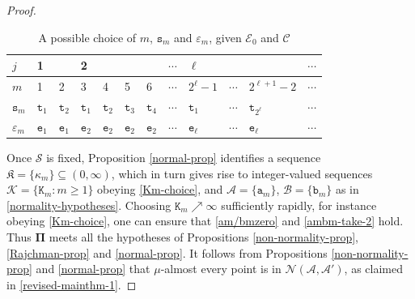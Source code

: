 \documentclass[12pt, twoside]{article}
\theoremstyle{definition}
\numberwithin{equation}{section}
\begin{document}
\begin{proof}
\begin{table}[htb]
		\begin{center}
			\begin{tabular}{|l|ll|llll|l|lll|l}
				\hline
				$j$ & 1 &   &  2 &   &   &   & $\cdots$ & $\ell$ &  & & $\cdots$\\
				\hline
				$m$ & 1 & 2 & 3 & 4 & 5 & 6 & $\cdots$ & $2^{\ell}-1$ & $\cdots$ & $2^{\ell +1}-2$ & $\cdots$\\
				\hline
				$\mathtt s_m$ & $\mathtt t_1$ & $\mathtt t_2$ & $\mathtt t_1$ & $\mathtt t_2$ & $\mathtt t_3$ & $\mathtt t_4$ & $\cdots$ & $\mathtt t_1$ & $\cdots$ & $\mathtt t_{2^{\ell}}$ & $\cdots$\\
				\hline
				$\varepsilon_m$ & $\mathtt e_1$ & $\mathtt e_1$ & $\mathtt e_2$ & $\mathtt e_2$ & $\mathtt e_2$ & $\mathtt e_2$ & $\cdots$ & $\mathtt e_{\ell}$ & $\cdots$ & $\mathtt e_{\ell}$ & $\cdots$\\
				\hline
			\end{tabular}
		\end{center}	
		\caption{A possible choice of $m$, $\mathtt s_m$ and $\varepsilon_m$, given $\mathcal{E}_0$ and $\mathscr{C}$} \label{table-1}
\end{table}
\vskip0.1in
\noindent Once $\mathcal S$ is fixed, Proposition \ref{normal-prop} identifies a sequence $\mathfrak{K} = \{ \kappa_m \} \subseteq (0, \infty)$, which in turn gives rise to integer-valued sequences $\mathcal K = \{\mathtt K_m : m\geq 1\}$ obeying \eqref{Km-choice}, and $\mathcal A = \{\mathtt a_m\}$, $\mathcal B = \{\mathtt b_m\}$ as in \eqref{normality-hypotheses}. Choosing $\mathtt K_m \nearrow \infty$ sufficiently rapidly, for instance obeying \eqref{Km-choice}, one can ensure that \eqref{am/bmzero} and \eqref{ambm-take-2} hold. Thus $\pmb{\Pi}$ meets all the hypotheses of Propositions \ref{non-normality-prop}, \ref{Rajchman-prop} and \ref{normal-prop}.    
\vskip0.1in
\noindent It follows from Propositions \ref{non-normality-prop} and \ref{normal-prop} that $\mu$-almost every point is in $\mathscr{N}(\mathscr{A}, \mathscr{A}')$, as claimed in \eqref{revised-mainthm-1}. 

\end{proof}
\end{document}
